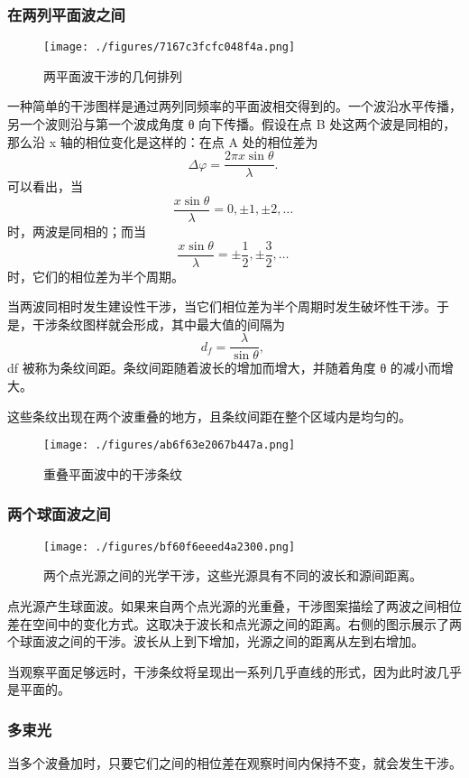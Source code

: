 \subsubsection{在两列平面波之间}
\begin{figure}[ht]
\centering
\texttt{[image: ./figures/7167c3fcfc048f4a.png]}
\caption{两平面波干涉的几何排列} \label{fig_GSWLX_6}
\end{figure}
一种简单的干涉图样是通过两列同频率的平面波相交得到的。一个波沿水平传播，另一个波则沿与第一个波成角度 θ 向下传播。假设在点 B 处这两个波是同相的，那么沿 x 轴的相位变化是这样的：在点 A 处的相位差为
\[
\Delta \varphi = \frac{2\pi x \sin \theta}{\lambda}.~
\]
可以看出，当
\[
\frac{x \sin \theta}{\lambda} = 0, \pm 1, \pm 2, \ldots~
\]
时，两波是同相的；而当
\[
\frac{x \sin \theta}{\lambda} = \pm \frac{1}{2}, \pm \frac{3}{2}, \ldots~
\]
时，它们的相位差为半个周期。

当两波同相时发生建设性干涉，当它们相位差为半个周期时发生破坏性干涉。于是，干涉条纹图样就会形成，其中最大值的间隔为
\[
d_f = \frac{\lambda}{\sin \theta},~
\]
df 被称为条纹间距。条纹间距随着波长的增加而增大，并随着角度 θ 的减小而增大。

这些条纹出现在两个波重叠的地方，且条纹间距在整个区域内是均匀的。
\begin{figure}[ht]
\centering
\texttt{[image: ./figures/ab6f63e2067b447a.png]}
\caption{重叠平面波中的干涉条纹} \label{fig_GSWLX_7}
\end{figure}
\subsubsection{两个球面波之间}
\begin{figure}[ht]
\centering
\texttt{[image: ./figures/bf60f6eeed4a2300.png]}
\caption{两个点光源之间的光学干涉，这些光源具有不同的波长和源间距离。} \label{fig_GSWLX_8}
\end{figure}
点光源产生球面波。如果来自两个点光源的光重叠，干涉图案描绘了两波之间相位差在空间中的变化方式。这取决于波长和点光源之间的距离。右侧的图示展示了两个球面波之间的干涉。波长从上到下增加，光源之间的距离从左到右增加。

当观察平面足够远时，干涉条纹将呈现出一系列几乎直线的形式，因为此时波几乎是平面的。

\subsubsection{多束光}

当多个波叠加时，只要它们之间的相位差在观察时间内保持不变，就会发生干涉。

